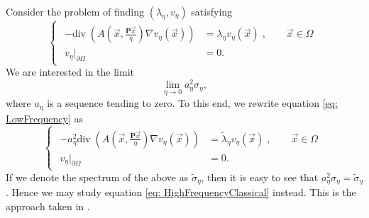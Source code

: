 \documentclass[a4paper,reqno]{amsart}
\numberwithin{equation}{section}
\numberwithin{equation}{section}		%
\numberwithin{figure}{section}			%
\numberwithin{table}{section}				%
\theoremstyle{definition}
\renewcommand{\tilde}{\widetilde}
\newcommand{\<}{\ensuremath \leq}
\renewcommand{\>}{\ensuremath \geq}
\renewcommand{\tilde}{\widetilde}
\begin{document}
Consider the problem of finding $(\lambda_\eta,v_\eta)$ satisfying
\begin{equation}\label{eq: LowFrequency}
    \begin{cases}
        \begin{aligned}
          -  \mathrm{div} \; \left( A\left( \vec{x}, \frac{\textbf{P} \vec{x}}{\eta} \right) \nabla v_\eta({\vec x}) \right ) & = \lambda_\eta v_\eta({\vec x}) \;, \qquad \vec{x} \in \Omega\\
            v_\eta|_{\partial\Omega} & = 0.
        \end{aligned}
    \end{cases}
\end{equation}
We are interested in the limit
\begin{equation}
    \lim_{\eta\rightarrow0} a_\eta^{2}\sigma_\eta,
\end{equation}
where $a_\eta$ is a sequence tending to zero. To this end, we rewrite equation \eqref{eq: LowFrequency} as
\begin{equation}\label{eq: HighFrequencyClassical}
    \begin{cases}
        \begin{aligned}
          -  a_\eta^2\mathrm{div} \; \left( A\left( \vec{x}, \frac{\textbf{P} \vec{x}}{\eta} \right) \nabla v_\eta({\vec x}) \right ) & = \tilde{\lambda}_\eta v_\eta({\vec x}) \;, \qquad \vec{x} \in \Omega\\
            v_\eta|_{\partial\Omega} & = 0.
        \end{aligned}
    \end{cases}
\end{equation}
If we denote the spectrum of the above as $\tilde{\sigma}_\eta$, then it is easy to see that $a_\eta^{2}\sigma_\eta = \tilde{\sigma}_\eta$. Hence we may study equation \eqref{eq: HighFrequencyClassical} instead. This is the approach taken in \cite{allaire1998bloch}.
\end{document}
